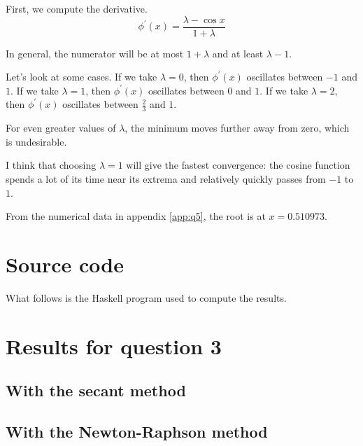 \documentclass[11pt,letterpaper]{article}
\begin{document}
\begin{enumerate}
    First, we compute the derivative.
    \begin{equation*}
      \phi^\prime(x) = \frac{\lambda - \cos x}{1 + \lambda}
    \end{equation*}

    In general, the numerator will be at most $1 + \lambda$ and at least
    $\lambda - 1$.

    Let's look at some cases.
    If we take $\lambda = 0$,
    then $\phi^\prime(x)$ oscillates between $-1$ and $1$.
    If we take $\lambda = 1$,
    then $\phi^\prime(x)$ oscillates between $0$ and $1$.
    If we take $\lambda = 2$,
    then $\phi^\prime(x)$ oscillates between $\frac{2}{3}$ and $1$.

    For even greater values of $\lambda$, the minimum moves further away from
    zero, which is undesirable.

    I think that choosing $\lambda = 1$ will give the fastest convergence: the
    cosine function spends a lot of its time near its extrema and relatively
    quickly passes from $-1$ to $1$.

    From the numerical data in appendix \ref{app:q5}, the root is at
    $x = 0.510973$.
\end{enumerate}

\appendix

\section{Source code}

What follows is the Haskell program used to compute the results.



\section{Results for question 3}
\label{app:q3-results}

\subsection{With the secant method}



\subsection{With the Newton-Raphson method}
\end{document}
